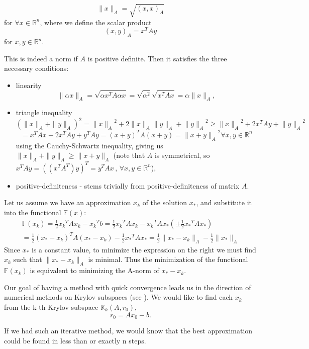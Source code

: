 \[\|x\|_A = \sqrt{(x,x)_A}\] for \(\forall{x}\in\mathbb{R}^n \), where we define the scalar product \[(x,y)_A = x^TAy \] for \(x,y\in\mathbb{R}^n  \).

This is indeed a norm if \(A \) is positive definite. Then it satisfies the three necessary conditions:
\begin{itemize}
    \item linearity
    \[\|\alpha x\|_A = \sqrt{\alpha x^TA\alpha x } = \sqrt{\alpha^2}\sqrt{x^TA x} = \alpha\|x\|_A, \]
    \item triangle inequality
    \[ (\|x\|_A+\|y\|_A)^2 = {\|x\|_A}^2 + 2\|x\|_A\|y\|_A +  {\|y\|_A}^2\geq {\|x\|_A}^2 + 2x^TAy +  {\|y\|_A}^2 \]
    \[ = x^TAx + 2x^TAy + y^TAy = (x+y)^TA(x+y) = {\|x+y\|_A}^2 \forall x,y \in\mathbb{R}^n\]
    using the Cauchy-Schwartz inequality, giving us \(\|x\|_A+\|y\|_A \geq \|x+y\|_A\)
    (note that \(A \) is symmetrical, so \(x^TAy = ((x^TA^T)y)^T = y^TAx \,,\, \forall x,y \in\mathbb{R}^n\)),
    \item positive-definiteness - stems trivially from positive-definiteness of matrix \(A\).
\end{itemize}

Let us assume we have an approximation \(x_k\) of the solution \(x_*\), and substitute it into the functional \(\mathbb{F}(x)\):
\begin{equation}
\begin{split}
\mathbb{F}(x_k) = \frac{1}{2}{x_k}^{T}Ax_k - {x_k}^{T}b = \frac{1}{2}{x_k}^{T}Ax_k - {x_k}^{T}Ax_* (\pm\frac{1}{2}{x_*}^{T}Ax_*) \\ = \frac{1}{2}{(x_*-x_k)}^{T}A(x_*-x_k) - \frac{1}{2}{x_*}^{T}Ax_* = \frac{1}{2}\|x_* - x_k\|_A-\frac{1}{2}\|x_*\|_A
\end{split}
\end{equation}
Since \(x_*\) is a constant value, to minimize the expression on the right we must find \(x_k\) such that \(\|x_* - x_k\|_A\) is minimal. Thus the minimization of the functional \(\mathbb{F}(x_k)\) is equivalent to minimizing the A-norm of \(x_* - x_k \).

Our goal of having a method with quick convergence leads us in the direction of numerical methods on Krylov subspaces (see \cite{LiesenStrakos12}). We would like to find each \(x_k\) from the k-th Krylov subspace \(\mathbb{K}_k(A,r_0), \)
\begin{equation}
r_0 =Ax_0 - b.
\end{equation}

If we had such an iterative method, we would know that the best approximation could be found in less than or exactly n steps.

